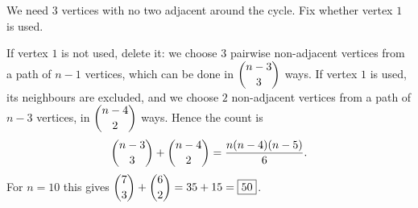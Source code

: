 We need $3$ vertices with no two adjacent around the cycle. Fix whether vertex $1$ is used.

If vertex $1$ is not used, delete it: we choose $3$ pairwise non-adjacent vertices from a path of $n-1$ vertices, which can be done in $\dbinom{n-3}{3}$ ways. If vertex $1$ is used, its neighbours are excluded, and we choose $2$ non-adjacent vertices from a path of $n-3$ vertices, in $\dbinom{n-4}{2}$ ways. Hence the count is
\[\dbinom{n-3}3+\dbinom{n-4}2=\dfrac{n(n-4)(n-5)}6.\]
For $n=10$ this gives $\dbinom73+\dbinom62=35+15=\boxed{50}$.
